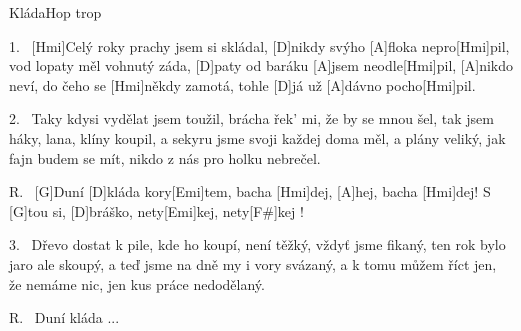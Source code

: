 \begin{song}{Kláda}{Hop trop}

\begin{xverse}{1.~}
[\large Hmi]Celý roky prachy jsem si skládal,
[\large D]nikdy svýho [\large A]floka nepro[\large Hmi]pil,
vod lopaty měl vohnutý záda,
[\large D]paty od baráku [\large A]jsem neodle[\large Hmi]pil,
[\large A]nikdo neví, do čeho se [\large Hmi]někdy zamotá,
tohle [\large D]já už [\large A]dávno pocho[\large Hmi]pil.
\end{xverse}


\begin{xverse}{2.~}
Taky kdysi vydělat jsem toužil,
brácha řek' mi, že by se mnou šel,
tak jsem háky, lana, klíny koupil,
a sekyru jsme svoji každej doma měl,
a plány veliký, jak fajn budem se mít,
nikdo z nás pro holku nebrečel.
\end{xverse}


\begin{xverse}{R.~}
[\large G]Duní [\large D]kláda kory[\large Emi]tem, bacha [\large Hmi]dej, [\large A]hej, bacha [\large Hmi]dej!
S [\large G]tou si, [\large D]bráško, nety[\large Emi]kej, nety[\large F#]kej !
\end{xverse}


\begin{xverse}{3.~}
Dřevo dostat k pile, kde ho koupí,
není těžký, vždyť jsme fikaný,
ten rok bylo jaro ale skoupý,
a teď jsme na dně my i vory svázaný,
a k tomu můžem říct jen, že nemáme nic,
jen kus práce nedodělaný.
\end{xverse}


\begin{xverse}{R.~}
Duní kláda ...
\end{xverse}
\end{song}

